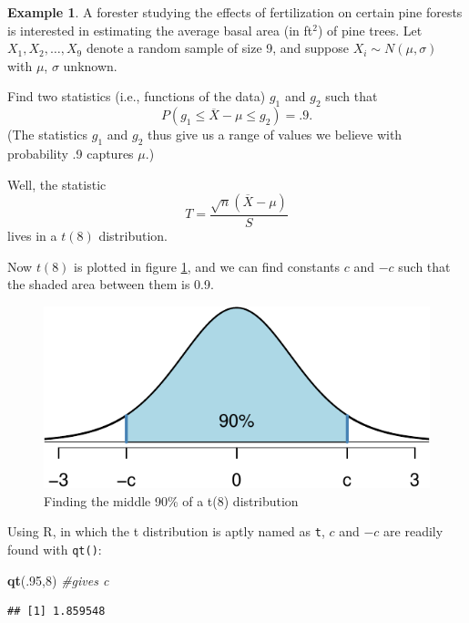 \documentclass[
]{book}
\newenvironment{Shaded}{\begin{snugshade}}{\end{snugshade}}
\newcommand{\CommentTok}[1]{\textcolor[rgb]{0.56,0.35,0.01}{\textit{#1}}}
\newcommand{\DecValTok}[1]{\textcolor[rgb]{0.00,0.00,0.81}{#1}}
\newcommand{\FunctionTok}[1]{\textcolor[rgb]{0.13,0.29,0.53}{\textbf{#1}}}
\newcommand{\NormalTok}[1]{#1}
\theoremstyle{definition}
\theoremstyle{definition}
\newtheorem{example}{Example}[chapter]
\theoremstyle{definition}
\theoremstyle{definition}
\theoremstyle{remark}
\begin{document}
\begin{example}
\protect\hypertarget{exm:t-distribution-practice}{}\label{exm:t-distribution-practice}A forester studying the effects of fertilization on certain pine forests is interested in estimating the average basal area (in ft\(^2\)) of pine trees.
Let \(X_1, X_2, \ldots, X_9\) denote a random sample of size 9, and suppose \(X_i \sim N(\mu,\sigma)\) with \(\mu\), \(\sigma\) unknown.

Find two statistics (i.e., functions of the data) \(g_1\) and \(g_2\) such that \[P(g_1 \leq \overline{X}-\mu \leq g_2) = .9.\]
(The statistics \(g_1\) and \(g_2\) thus give us a range of values we believe with probability .9 captures \(\mu\).)

Well, the statistic \[T = \frac{\sqrt{n}(\overline{X}-\mu)}{S}\] lives in a \(t(8)\) distribution.

Now \(t(8)\) is plotted in figure \ref{fig:t8}, and we can find constants \(c\) and \(-c\) such that the shaded area between them is 0.9.

\begin{figure}
\centering
\includegraphics{math340-notes_files/figure-latex/t8-1.pdf}
\caption{\label{fig:t8}Finding the middle 90\% of a t(8) distribution}
\end{figure}

Using R, in which the t distribution is aptly named as \texttt{t}, \(c\) and \(-c\) are readily found with \texttt{qt()}:

\begin{Shaded}
\begin{Highlighting}[]
\FunctionTok{qt}\NormalTok{(.}\DecValTok{95}\NormalTok{,}\DecValTok{8}\NormalTok{) }\CommentTok{\#gives c}
\end{Highlighting}
\end{Shaded}

\begin{verbatim}
## [1] 1.859548
\end{verbatim}


\end{example}
\end{document}
